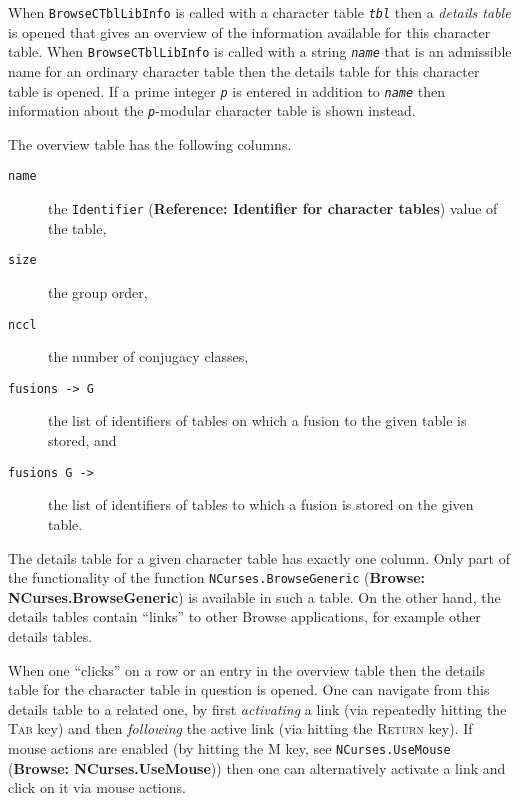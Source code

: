\documentclass[a4paper,11pt]{report}
\begin{document}
{{{ When \texttt{BrowseCTblLibInfo} is called with a character table \mbox{\texttt{\mdseries\slshape tbl}} then a \emph{details table} is opened that gives an overview of the information available for this
character table. When \texttt{BrowseCTblLibInfo} is called with a string \mbox{\texttt{\mdseries\slshape name}} that is an admissible name for an ordinary character table then the details
table for this character table is opened. If a prime integer \mbox{\texttt{\mdseries\slshape p}} is entered in addition to \mbox{\texttt{\mdseries\slshape name}} then information about the \mbox{\texttt{\mdseries\slshape p}}-modular character table is shown instead. 

 The overview table has the following columns. 

 
\begin{description}
\item[{\texttt{name}}]  the \texttt{Identifier} (\textbf{Reference: Identifier for character tables}) value of the table, 
\item[{\texttt{size}}]  the group order, 
\item[{\texttt{nccl}}]  the number of conjugacy classes, 
\item[{\texttt{fusions -{\textgreater} G}}]  the list of identifiers of tables on which a fusion to the given table is
stored, and 
\item[{\texttt{fusions G -{\textgreater}}}]  the list of identifiers of tables to which a fusion is stored on the given
table. 
\end{description}
 

 The details table for a given character table has exactly one column. Only
part of the functionality of the function \texttt{NCurses.BrowseGeneric} (\textbf{Browse: NCurses.BrowseGeneric}) is available in such a table. On the other hand, the details tables contain ``links'' to other Browse applications, for example other details tables. 

 When one ``clicks'' on a row or an entry in the overview table then the details table for the
character table in question is opened. One can navigate from this details
table to a related one, by first \emph{activating} a link (via repeatedly hitting the \textsc{Tab} key) and then \emph{following} the active link (via hitting the \textsc{Return} key). If mouse actions are enabled (by hitting the \textsc{M} key, see \texttt{NCurses.UseMouse} (\textbf{Browse: NCurses.UseMouse})) then one can alternatively activate a link and click on it via mouse
actions. 

}}}
\end{document}
